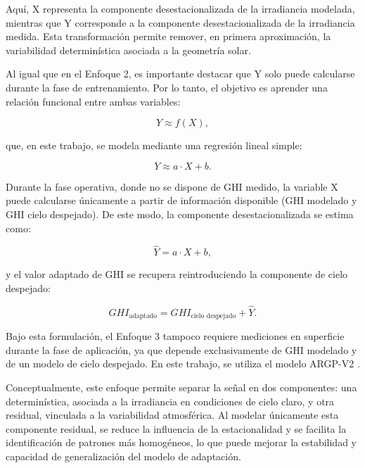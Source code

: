 Aquí, X representa la componente desestacionalizada de la irradiancia modelada, mientras que Y corresponde a la componente desestacionalizada de la irradiancia medida. Esta transformación permite remover, en primera aproximación, la variabilidad determinística asociada a la geometría solar.

Al igual que en el Enfoque 2, es importante destacar que Y solo puede calcularse durante la fase de entrenamiento. Por lo tanto, el objetivo es aprender una relación funcional entre ambas variables:

\begin{equation}
Y \approx f(X),
\end{equation}

que, en este trabajo, se modela mediante una regresión lineal simple:

\begin{equation}
Y \approx a \cdot X + b.
\end{equation}

Durante la fase operativa, donde no se dispone de GHI
medido, la variable X puede calcularse únicamente a partir de información disponible (GHI modelado y GHI cielo despejado). De este modo, la componente desestacionalizada se estima como:

\begin{equation}
\widehat{Y} = a \cdot X + b,
\end{equation}

y el valor adaptado de GHI se recupera reintroduciendo la componente de cielo despejado:

\begin{equation}
GHI_{\text{adaptado}} = GHI_{\text{cielo despejado}} + \widehat{Y}.
\label{eq:approach3}
\end{equation}

Bajo esta formulación, el Enfoque 3 tampoco requiere mediciones en superficie durante la fase de aplicación, ya que depende exclusivamente de GHI modelado y de un modelo de cielo despejado. En este trabajo, se utiliza el modelo ARGP-V2 \cite{Ledesma2023a}.

Conceptualmente, este enfoque permite separar la señal en dos componentes: una determinística, asociada a la irradiancia en condiciones de cielo claro, y otra residual, vinculada a la variabilidad atmosférica. Al modelar únicamente esta componente residual, se reduce la influencia de la estacionalidad y se facilita la identificación de patrones más homogéneos, lo que puede mejorar la estabilidad y capacidad de generalización del modelo de adaptación.


